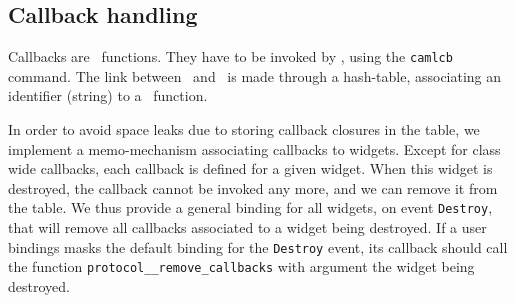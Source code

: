 \subsection{Callback handling}
Callbacks are \caml\ functions. They have to be invoked by \tcl, using the
\verb|camlcb| command. The link between \tcl\ and \caml\ is made through
a hash-table, associating an identifier (string) to a \caml\ function.

In order to avoid space leaks due to storing callback closures in the table,
we implement a memo-mechanism associating callbacks to widgets.
Except for class wide callbacks, each callback is defined for a given
widget. When this widget is destroyed, the callback cannot be invoked any
more, and we can remove it from the table. We thus provide a general binding
for all widgets, on event \verb|Destroy|, that will remove all callbacks
associated to a widget being destroyed.
If a user bindings masks the default binding for the \verb|Destroy| event,
its callback should call the function \verb|protocol__remove_callbacks| with
argument the widget being destroyed.

